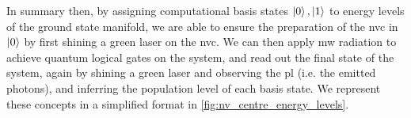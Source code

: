 \par 

In summary then, by assigning computational basis states $\ket{0}, \ket{1}$ to energy levels of the ground state manifold, 
    we are able to ensure the preparation of the \gls{nvc} in $\ket{0}$ by first shining a green laser on the \gls{nvc}. 
We can then apply \gls{mw} radiation to achieve quantum logical gates on the system, 
    and read out the final state of the system, again by shining a green laser
    and observing the \gls{pl} (i.e. the emitted photons), and inferring the population level of each basis state. 
We represent these concepts in a simplified format in \cref{fig:nv_centre_energy_levels}. 

